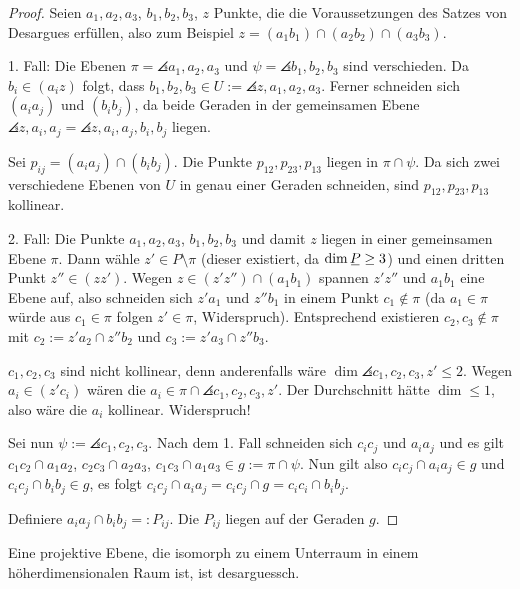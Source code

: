 \begin{proof}
 Seien $a_1, a_2, a_3$, $b_1, b_2, b_3$, $z$ Punkte, die die Voraussetzungen des Satzes von Desargues erfüllen, also zum Beispiel $z = (a_1 b_1) \cap (a_2 b_2) \cap (a_3 b_3)$.
 
 1. Fall: Die Ebenen $\pi = \angles{a_1, a_2, a_3}$ und $\psi = \angles{b_1, b_2, b_3}$ sind verschieden. Da $b_i \in (a_i z)$ folgt, dass $b_1, b_2, b_3 \in U := \angles{z, a_1, a_2, a_3}$. Ferner schneiden sich $(a_i a_j)$ und $(b_i b_j)$, da beide Geraden in der gemeinsamen Ebene $\angles{z, a_i, a_j} = \angles{ z, a_i, a_j, b_i, b_j}$ liegen.
 
 Sei $p_{ij} = (a_i a_j) \cap (b_i b_j)$. Die Punkte $p_{12}, p_{23}, p_{13}$ liegen in $\pi \cap \psi$. Da sich zwei verschiedene Ebenen von $U$ in genau einer Geraden schneiden, sind $p_{12}, p_{23}, p_{13}$ kollinear.
 
 2. Fall: Die Punkte $a_1, a_2, a_3$, $b_1, b_2, b_3$ und damit $z$ liegen in einer gemeinsamen Ebene $\pi$. Dann wähle $z' \in P \setminus \pi$ (dieser existiert, da $\dim \proj \ge 3$) und einen dritten Punkt $z'' \in (zz')$. Wegen $z \in (z'z'') \cap (a_1 b_1)$ spannen $z'z''$ und $a_1 b_1$ eine Ebene auf, also schneiden sich $z'a_1$ und $z'' b_1$  in einem Punkt $c_1 \notin \pi$ (da $a_1 \in \pi$ würde aus $c_1 \in \pi$ folgen $z' \in \pi$, Widerspruch). Entsprechend existieren $c_2, c_3 \notin \pi$ mit $c_2 := z' a_2 \cap z'' b_2$ und $c_3 := z' a_3 \cap z'' b_3$.
 
 $c_1, c_2, c_3$ sind nicht kollinear, denn anderenfalls wäre $\dim \angles{c_1,c_2,c_3,z'} \le 2$. Wegen $a_i \in (z' c_i)$ wären die $a_i \in \pi \cap \angles{c_1, c_2, c_3, z'}$. Der Durchschnitt hätte $\dim \le 1$, also wäre die $a_i$ kollinear. Widerspruch!
 
 Sei nun $\psi := \angles{c_1,c_2,c_3}$. Nach dem 1. Fall schneiden sich $c_i c_j$ und $a_i a_j$ und es gilt $c_1 c_2 \cap a_1 a_2$, $c_2 c_3 \cap a_2 a_3$, $c_1 c_3 \cap a_1 a_3 \in g := \pi \cap \psi$. Nun gilt also $c_i c_j \cap a_i a_j \in g$ und $c_i c_j \cap b_i b_j \in g$, es folgt $c_i c_j \cap a_i a_j = c_i c_j \cap g = c_i c_i \cap b_i b_j$. 

 Definiere $a_i a_j \cap b_i b_j =: P_{ij}$. Die $P_{ij}$ liegen auf der Geraden $g$.
\end{proof}

\begin{folg*}
 Eine projektive Ebene, die isomorph zu einem Unterraum in einem höher\-dimen\-sionalen Raum ist, ist desarguessch.
\end{folg*}